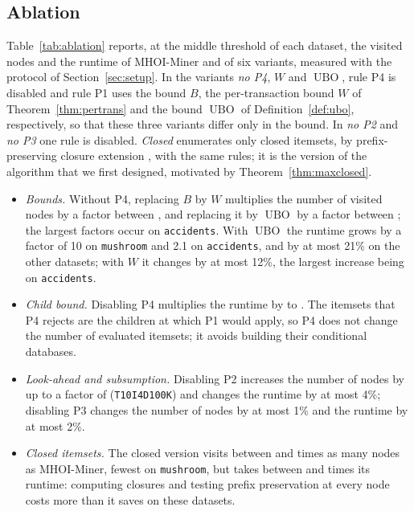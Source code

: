 \documentclass[pdflatex,sn-mathphys,Numbered]{sn-jnl}
\theoremstyle{thmstyleone}
\theoremstyle{thmstyletwo}
\theoremstyle{thmstylethree}
\newcommand{\ubo}{\operatorname{UBO}}
\newcommand{\Algo}{MHOI-Miner}
\begin{document}
\subsection{Ablation}\label{sec:ablation}

Table~\ref{tab:ablation} reports, at the middle threshold of each dataset, the visited nodes and the runtime of \Algo{} and of six variants, measured with the protocol of Section~\ref{sec:setup}. In the variants \emph{no P4}, \emph{$W$} and \emph{$\ubo$}, rule P4 is disabled and rule P1 uses the bound $B$, the per-transaction bound $W$ of Theorem~\ref{thm:pertrans} and the bound $\ubo$ of Definition~\ref{def:ubo}, respectively, so that these three variants differ only in the bound. In \emph{no P2} and \emph{no P3} one rule is disabled. \emph{Closed} enumerates only closed itemsets, by prefix-preserving closure extension \cite{uno2004lcm}, with the same rules; it is the version of the algorithm that we first designed, motivated by Theorem~\ref{thm:maxclosed}.

\begin{itemize}
\item \emph{Bounds.} Without P4, replacing $B$ by $W$ multiplies the number of visited nodes by a factor between \AblNodesWOverB{}, and replacing it by $\ubo$ by a factor between \AblNodesUboOverB{}; the largest factors occur on \texttt{accidents}. With $\ubo$ the runtime grows by a factor of 10 on \texttt{mushroom} and 2.1 on \texttt{accidents}, and by at most 21\% on the other datasets; with $W$ it changes by at most 12\%, the largest increase being on \texttt{accidents}.
\item \emph{Child bound.} Disabling P4 multiplies the runtime by \AblTimeNoPreMin{} to \AblTimeNoPreMax{}. The itemsets that P4 rejects are the children at which P1 would apply, so P4 does not change the number of evaluated itemsets; it avoids building their conditional databases.
\item \emph{Look-ahead and subsumption.} Disabling P2 increases the number of nodes by up to a factor of \AblNodesNoHutMax{} (\texttt{T10I4D100K}) and changes the runtime by at most 4\%; disabling P3 changes the number of nodes by at most 1\% and the runtime by at most 2\%.
\item \emph{Closed itemsets.} The closed version visits between \AblNodesClosedMin{} and \AblNodesClosedMax{} times as many nodes as \Algo{}, fewest on \texttt{mushroom}, but takes between \AblTimeClosedMin{} and \AblTimeClosedMax{} times its runtime: computing closures and testing prefix preservation at every node costs more than it saves on these datasets.
\end{itemize}
\end{document}
